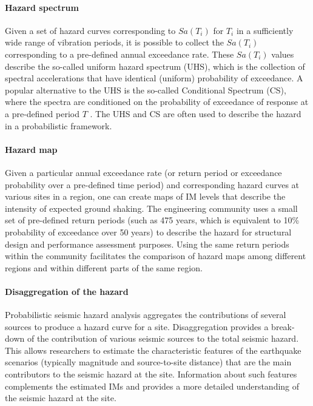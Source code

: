 \paragraph{Hazard spectrum} Given a set of hazard curves corresponding to $Sa(T_i)$ for $T_i$ in a sufficiently wide range of vibration periods, it is possible to collect the $Sa(T_i)$ corresponding to a pre-defined annual exceedance rate. These $Sa(T_i)$ values describe the so-called uniform hazard spectrum (UHS), which is the collection of spectral accelerations that have identical (uniform) probability of exceedance. A popular alternative to the UHS is the so-called Conditional Spectrum (CS), where the spectra are conditioned on the probability of exceedance of response at a pre-defined period $T$ \citep{lin2013conditional, baker2018improved}. The UHS and CS are often used to describe the hazard in a probabilistic framework.

\paragraph{Hazard map} Given a particular annual exceedance rate (or return period or exceedance probability over a pre-defined time period) and corresponding hazard curves at various sites in a region, one can create maps of IM levels that describe the intensity of expected ground shaking. The engineering community uses a small set of pre-defined return periods (such as 475 years, which is equivalent to 10\% probability of exceedance over 50 years) to describe the hazard for structural design and performance assessment purposes. Using the same return periods within the community facilitates the comparison of hazard maps among different regions and within different parts of the same region.

\paragraph{Disaggregation of the hazard} Probabilistic seismic hazard analysis aggregates the contributions of several sources to produce a hazard curve for a site. Disaggregation provides a break-down of the contribution of various seismic sources to the total seismic hazard. This allows researchers to estimate the characteristic features of the earthquake scenarios (typically magnitude and source-to-site distance) that are the main contributors to the seismic hazard at the site. Information about such features complements the estimated IMs and provides a more detailed understanding of the seismic hazard at the site.

